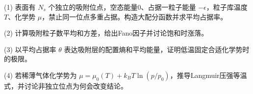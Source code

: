 (1) 表面有 \(N_s\) 个独立的吸附位点，空态能量0、占据一粒子能量 \(-\epsilon\)，粒子库温度 \(T\)、化学势 \(\mu\)，禁止同一位点多重占据。构造大配分函数并求平均占据率。

(2) 计算吸附粒子数平均和方差，给出Fano因子并讨论饱和时涨落。

(3) 以平均占据率 \(\theta\) 表达吸附层的配置熵和平均能量，证明低温固定合适化学势时的极限。

(4) 若稀薄气体化学势为 \(\mu=\mu_0(T)+k_BT\ln(p/p_0)\)，推导Langmuir压强等温式，并讨论非独立位点为何会改变结论。
